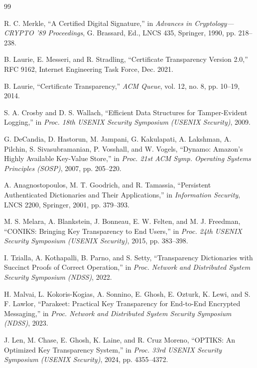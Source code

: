 \begin{thebibliography}{99}

R. C. Merkle,
\newblock ``A Certified Digital Signature,''
\newblock in \emph{Advances in Cryptology---CRYPTO '89 Proceedings}, G. Brassard, Ed., LNCS 435, Springer, 1990, pp. 218--238.

B. Laurie, E. Messeri, and R. Stradling,
\newblock ``Certificate Transparency Version 2.0,''
\newblock RFC 9162, Internet Engineering Task Force, Dec. 2021.

B. Laurie,
\newblock ``Certificate Transparency,''
\newblock \emph{ACM Queue}, vol. 12, no. 8, pp. 10--19, 2014.

S. A. Crosby and D. S. Wallach,
\newblock ``Efficient Data Structures for Tamper-Evident Logging,''
\newblock in \emph{Proc. 18th USENIX Security Symposium (USENIX Security)}, 2009.

G. DeCandia, D. Hastorun, M. Jampani, G. Kakulapati, A. Lakshman, A. Pilchin, S. Sivasubramanian, P. Vosshall, and W. Vogels,
\newblock ``Dynamo: Amazon's Highly Available Key-Value Store,''
\newblock in \emph{Proc. 21st ACM Symp. Operating Systems Principles (SOSP)}, 2007, pp. 205--220.

A. Anagnostopoulos, M. T. Goodrich, and R. Tamassia,
\newblock ``Persistent Authenticated Dictionaries and Their Applications,''
\newblock in \emph{Information Security}, LNCS 2200, Springer, 2001, pp. 379--393.

M. S. Melara, A. Blankstein, J. Bonneau, E. W. Felten, and M. J. Freedman,
\newblock ``CONIKS: Bringing Key Transparency to End Users,''
\newblock in \emph{Proc. 24th USENIX Security Symposium (USENIX Security)}, 2015, pp. 383--398.

I. Tzialla, A. Kothapalli, B. Parno, and S. Setty,
\newblock ``Transparency Dictionaries with Succinct Proofs of Correct Operation,''
\newblock in \emph{Proc. Network and Distributed System Security Symposium (NDSS)}, 2022.

H. Malvai, L. Kokoris-Kogias, A. Sonnino, E. Ghosh, E. Ozturk, K. Lewi, and S. F. Lawlor,
\newblock ``Parakeet: Practical Key Transparency for End-to-End Encrypted Messaging,''
\newblock in \emph{Proc. Network and Distributed System Security Symposium (NDSS)}, 2023.

J. Len, M. Chase, E. Ghosh, K. Laine, and R. Cruz Moreno,
\newblock ``OPTIKS: An Optimized Key Transparency System,''
\newblock in \emph{Proc. 33rd USENIX Security Symposium (USENIX Security)}, 2024, pp. 4355--4372.


\end{thebibliography}
